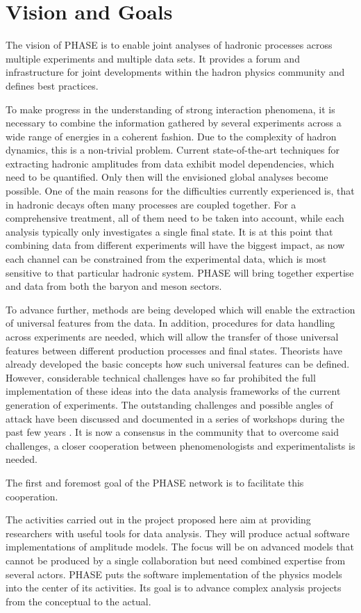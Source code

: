 \section{Vision and Goals}

The vision of PHASE is to enable joint analyses of hadronic processes across multiple experiments and multiple data sets. It provides a forum and infrastructure for joint developments within the hadron physics community and defines best practices.

To make progress in the understanding of strong interaction phenomena, it is necessary to combine the information gathered by several experiments across a wide range of energies in a coherent fashion. Due to the complexity of hadron dynamics, this is a non-trivial problem. Current state-of-the-art techniques for extracting hadronic amplitudes from data exhibit model dependencies, which need to be quantified. Only then will the envisioned global analyses become possible. One of the main reasons for the difficulties currently experienced is, that in hadronic decays often many processes are coupled together. For a comprehensive treatment, all of them need to be taken into account, while each analysis typically only investigates a single final state. It is at this point that combining data from different experiments will have the biggest impact, as now each channel can be constrained from the experimental data, which is most sensitive to that particular hadronic system. PHASE will bring together expertise and data from both the baryon and meson sectors.

To advance further, methods are being developed which will enable the extraction of universal features from the data. In addition, procedures for data handling across experiments are needed, which will allow the transfer of those universal features between different production processes and final states. Theorists have already developed the basic concepts how such universal features can be defined. However, considerable technical challenges have so far prohibited the full implementation of these ideas into the data analysis frameworks of the current generation of experiments. The outstanding challenges and possible angles of attack have been discussed and documented in a series of workshops during the past few years \cite{Battaglieri_2015, Brice_o_2016, Lutz_2016}. It is now a consensus in the community that to overcome said challenges, a closer cooperation between phenomenologists and experimentalists is needed. 

The first and foremost goal of the PHASE network is to facilitate this cooperation. 

The activities carried out in the project proposed here aim at providing researchers with useful tools for data analysis. They will produce actual software implementations of amplitude models. The focus will be on advanced models that cannot be produced by a single collaboration but need combined expertise from several actors. PHASE puts the software implementation of the physics models into the center of its activities. Its goal is to advance complex analysis projects from the conceptual to the actual.





